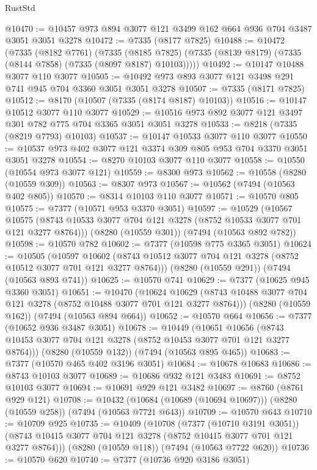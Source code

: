 \begin{lexlean}{RustStd}
\begin{coremodule}
{\begin{coremodule}
{{{{{{{{{{{{{{{{{{{{{{{{{{{{{{{{@10470 := @10457 @973 @894 @3077 @121 @3499 @162 @664 @936 @704 @3487 @3051 @3051 @3278
@10472 := @7335 (@8177 @7825)
@10488 := @10472
    (@7335
      (@8182 @7761)
      (@7335
        (@8185 @7825)
        (@7335 (@8139 @8179) (@7335 (@8144 @7858) (@7335 (@8097 @8187) @10103)))))
@10492 := @10147 @10488 @3077 @110 @3077
@10505 := @10492 @973 @893 @3077 @121 @3498 @291 @741 @945 @704 @3360 @3051 @3051 @3278
@10507 := @7335 (@8171 @7825)
@10512 := @8170 (@10507 (@7335 (@8174 @8187) @10103))
@10516 := @10147 @10512 @3077 @110 @3077
@10529 := @10516 @973 @892 @3077 @121 @3497 @301 @782 @775 @704 @3365 @3051 @3051 @3278
@10533 := @8218 (@7335 (@8219 @7793) @10103)
@10537 := @10147 @10533 @3077 @110 @3077
@10550 := @10537 @973 @402 @3077 @121 @3374 @309 @805 @953 @704 @3370 @3051 @3051 @3278
@10554 := @8270 @10103 @3077 @110 @3077
@10558 := @10550 (@10554 @973 @3077 @121)
@10559 := @8300 @973
@10562 := @10558 (@8280 (@10559 @309))
@10563 := @8307 @973
@10567 := @10562 (@7494 (@10563 @402 @805))
@10570 := @8314 @10103 @110 @3077
@10571 := @10570 @805
@10575 := @7377 (@10571 @953 @3370 @3051)
@10597 := @10529
    (@10567 @10575 (@8743 @10533 @3077 @704 @121 @3278 (@8752 @10533 @3077 @701 @121 @3277 @8764)))
    (@8280 (@10559 @301))
    (@7494 (@10563 @892 @782))
@10598 := @10570 @782
@10602 := @7377 (@10598 @775 @3365 @3051)
@10624 := @10505
    (@10597 @10602 (@8743 @10512 @3077 @704 @121 @3278 (@8752 @10512 @3077 @701 @121 @3277 @8764)))
    (@8280 (@10559 @291))
    (@7494 (@10563 @893 @741))
@10625 := @10570 @741
@10629 := @7377 (@10625 @945 @3360 @3051)
@10651 := @10470
    (@10624 @10629 (@8743 @10488 @3077 @704 @121 @3278 (@8752 @10488 @3077 @701 @121 @3277 @8764)))
    (@8280 (@10559 @162))
    (@7494 (@10563 @894 @664))
@10652 := @10570 @664
@10656 := @7377 (@10652 @936 @3487 @3051)
@10678 := @10449
    (@10651 @10656 (@8743 @10453 @3077 @704 @121 @3278 (@8752 @10453 @3077 @701 @121 @3277 @8764)))
    (@8280 (@10559 @132))
    (@7494 (@10563 @895 @465))
@10683 := @7377 (@10570 @465 @402 @3196 @3051)
@10684 := @10678 @10683
@10686 := @8743 @10103 @3077
@10689 := @10686 @932 @121 @3483
@10691 := @8752 @10103 @3077
@10694 := @10691 @929 @121 @3482
@10697 := @8760 (@8761 @929 @121)
@10708 := @10432 (@10684 (@10689 (@10694 @10697))) (@8280 (@10559 @258)) (@7494 (@10563 @7721 @643))
@10709 := @10570 @643
@10710 := @10709 @925
@10735 := @10409
    (@10708
      (@7377 (@10710 @3191 @3051))
      (@8743 @10415 @3077 @704 @121 @3278 (@8752 @10415 @3077 @701 @121 @3277 @8764)))
    (@8280 (@10559 @118))
    (@7494 (@10563 @7722 @620))
@10736 := @10570 @620
@10740 := @7377 (@10736 @920 @3186 @3051)
}}}}}}}}}}}}}}}}}}}}}}}}}}}}}}}}
\end{coremodule}}
\end{coremodule}
\end{lexlean}
